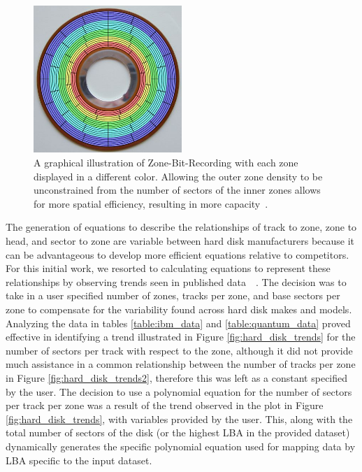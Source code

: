 \documentclass[12pt]{ucthesis}
\begin{document}
\begin{figure}[h!]
 \centering
 \includegraphics[width=0.5\textwidth]{images/zone_bit_recording.jpg}
 \caption[A graphical model of a Zone-Bit-Recording disk layout.]{A graphical illustration of Zone-Bit-Recording with each zone displayed in a different color. Allowing the outer zone density to be unconstrained from the number of sectors of the inner zones allows for more spatial efficiency, resulting in more capacity~\cite{website:pc_guide}.
}
 \label{fig:zbr}
\end{figure}

The generation of equations to describe the relationships of track to zone, zone to head, and sector to zone are variable between hard disk manufacturers because it can be advantageous to develop more efficient equations relative to competitors. For this initial work, we resorted to calculating equations to represent these relationships by observing trends seen in published data~\cite{quantum:manual}~\cite{ibm:manual}. The decision was to take in a user specified number of zones, tracks per zone, and base sectors per zone to compensate for the variability found across hard disk makes and models. Analyzing the data in tables \ref{table:ibm_data} and \ref{table:quantum_data} proved effective in identifying a trend illustrated in Figure \ref{fig:hard_disk_trends} for the number of sectors per track with respect to the zone, although it did not provide much assistance in a common relationship between the number of tracks per zone in Figure \ref{fig:hard_disk_trends2}, therefore this was left as a constant specified by the user. The decision to use a polynomial equation for the number of sectors per track per zone was a result of the trend observed in the plot in Figure \ref{fig:hard_disk_trends}, with variables provided by the user. This, along with the total number of sectors of the disk (or the highest LBA in the provided dataset) dynamically generates the specific polynomial equation used for mapping data by LBA specific to the input dataset.
\end{document}
